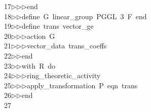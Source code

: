 \begin{tabbing}
17\>$\triangleright$\>$\triangleright$\>$\triangleright$\>end\ \\[0pt]
18\>$\triangleright$\>$\triangleright$\>define\ G\ linear\_group\ PGGL\ 3\ F\ end\ \\[0pt]
19\>$\triangleright$\>$\triangleright$\>define\ trans\ vector\_ge\ \\[0pt]
20\>$\triangleright$\>$\triangleright$\>$\triangleright$\>action\ G\ \\[0pt]
21\>$\triangleright$\>$\triangleright$\>$\triangleright$\>vector\_data\ trans\_coeffs\ \\[0pt]
22\>$\triangleright$\>$\triangleright$\>end\ \\[0pt]
23\>$\triangleright$\>$\triangleright$\>with\ R\ do\ \\[0pt]
24\>$\triangleright$\>$\triangleright$\>$\triangleright$\>ring\_theoretic\_activity\ \\[0pt]
25\>$\triangleright$\>$\triangleright$\>$\triangleright$\>apply\_transformation\ P\ eqn\ trans\ \\[0pt]
26\>$\triangleright$\>$\triangleright$\>end\ \\[0pt]
27\>\end{tabbing}
